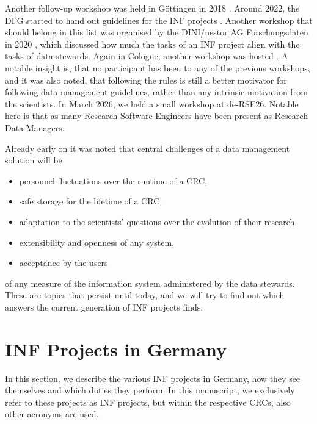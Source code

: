 \documentclass{eceasst}
\begin{document}
Another follow-up workshop was held in Göttingen in 2018 \cite{Roertgen2019}.
Around 2022, the DFG started to hand out guidelines for the INF projects \cite{bastian_2025}.
Another workshop that should belong in this list was organised by the DINI/nestor AG Forschungsdaten in 2020 \cite{Rizzolli_2021},
which discussed how much the tasks of an INF project align with the tasks of data stewards.
Again in Cologne, another workshop was hosted \cite{bastian_2025}. A notable insight is, that no participant has been to any
of the previous workshops, and it was also noted, that following the rules is still a better motivator for following data
management guidelines, rather than any intrinsic motivation from the scientists.
In March 2026, we held a small workshop at de-RSE26. Notable here is that as many Research Software Engineers have been present
as Research Data Managers.

Already early on \cite{mueckschel2006} it was noted that central challenges of a data management solution will be
\begin{itemize}
 \item personnel fluctuations over the runtime of a CRC,
 \item safe storage for the lifetime of a CRC,
 \item adaptation to the scientists' questions over the evolution of their research
 \item extensibility and openness of any system,
 \item acceptance by the users
\end{itemize}
of any measure of the information system administered by the data stewards.
These are topics that persist until today,
and we will try to find out which answers the current generation of INF projects finds.

\section{INF Projects in Germany}
\label{sec:inf-in-germany}
In this section, we describe the various INF projects in Germany, how they see themselves and which duties they perform.
In this manuscript, we exclusively refer to these projects as INF projects, but within the respective CRCs, also other acronyms are used.
\end{document}
